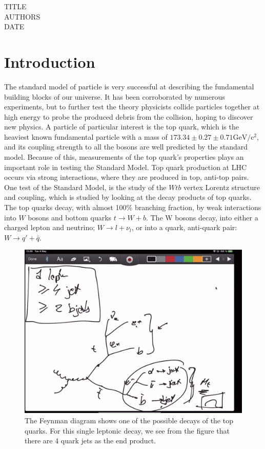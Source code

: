 \documentclass[11pt,a4paper]{article}
\begin{document}
TITLE\\
AUTHORS\\
DATE

\cleardoublepage{}
\begin{abstract}
  
\end{abstract}
\cleardoublepage{}
\tableofcontents{}
\section{Introduction}
The standard model of particle is very successful at describing the fundamental building blocks of our universe. It has been corroborated by numerous experiments, but to further test the theory physicists collide particles together at high energy to probe the produced debris from the collision, hoping to discover new physics. A particle of particular interest is the top quark, which is the heaviest known fundamental particle with a mass of $173.34 \pm 0.27 \pm 0.71 \mathrm{GeV/c^2}$, and its coupling strength to all the bosons are well predicted by the standard model. Because of this, measurements of the top quark's properties plays an important role in testing the Standard Model. Top quark production at LHC occurs via strong interactions, where they are produced in top, anti-top pairs. One test of the Standard Model, is the study of the $Wtb$ vertex Lorentz structure and coupling, which is studied by looking at the decay products of top quarks. The top quarks decay, with almost 100\% branching fraction, by weak interactions into $W$ bosons and bottom quarks $t \rightarrow W + b$. The W bosons decay, into either a charged lepton and neutrino; $W \rightarrow l + \nu_l$, or into a quark, anti-quark pair: $W \rightarrow q' + \bar{q}$.\\

\begin{figure}[H]
	\includegraphics[width=\linewidth]{Placeholder_FeynmanDiagram.png}
	\caption{The Feynman diagram shows one of the possible decays of the top quarks. For this single leptonic decay, we see from the figure that there are 4 quark jets as the end product.}
	\label{fig_feynmandiagram}
\end{figure}
\end{document}
